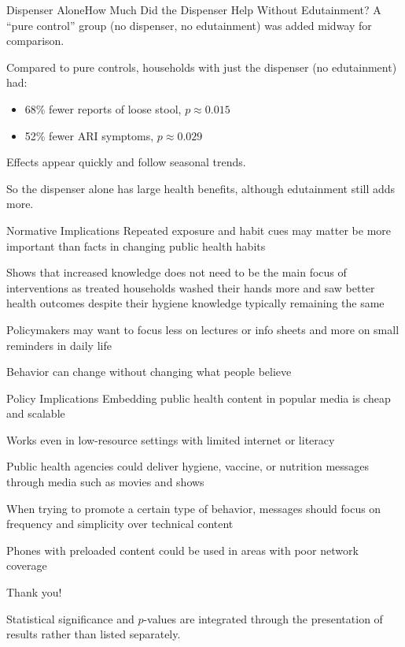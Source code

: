 \documentclass[aspectratio=169]{beamer}
\begin{document}
\begin{frame}{Dispenser Alone}{How Much Did the Dispenser Help Without Edutainment?}
	A “pure control” group (no dispenser, no edutainment) was added midway for comparison.

	Compared to pure controls, households with just the dispenser (no edutainment) had:
	\begin{itemize}
		\item 68\% fewer reports of loose stool, $p \approx 0.015$
		\item 52\% fewer ARI symptoms, $p \approx 0.029$
	\end{itemize}

	Effects appear quickly and follow seasonal trends.

	So the dispenser alone has large health benefits, although edutainment still adds more.
\end{frame}

\begin{frame}{Normative Implications}
	Repeated exposure and habit cues may matter be more important than facts in changing public health habits

	Shows that increased knowledge does not need to be the main focus of interventions as treated households washed their hands more and saw better health outcomes despite their hygiene knowledge typically remaining the same 

	Policymakers may want to focus less on lectures or info sheets and more on small reminders in daily life

	Behavior can change without changing what people believe
\end{frame}

\begin{frame}{Policy Implications}
	Embedding public health content in popular media is cheap and scalable

	Works even in low-resource settings with limited internet or literacy

	Public health agencies could deliver hygiene, vaccine, or nutrition messages through media such as movies and shows

	When trying to promote a certain type of behavior, messages should focus on frequency and simplicity over technical content 

	Phones with preloaded content could be used in areas with poor network coverage
\end{frame}

\begin{frame}
	\Huge
	\centering

	\vfill

	Thank you!

	\vfill

	\normalsize
	\flushleft


	\color{gray}Statistical significance and $p$-values are integrated through the
	presentation of results rather than listed separately.
\end{frame}
\end{document}
